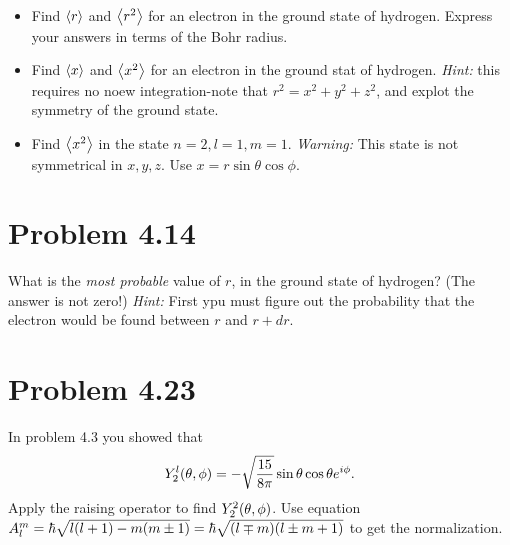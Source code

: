 \documentclass[../main.tex]{subfiles}
\begin{document}
\begin{itemize}
    \item Find $\expval{r}$ and $\expval{r^2}$ for an electron in the ground state of hydrogen.
        Express your answers in terms of the Bohr radius.
    \item Find $\expval{x}$ and $\expval{x^2}$ for an electron in the ground stat of hydrogen.
        \textit{Hint:} this requires no noew integration-note that $r^2=x^2+y^2+z^2$, and explot the symmetry of the ground state.
    \item Find $\expval{x^2}$ in the state $n=2,l=1,m=1$. \textit{Warning:} This state is not symmetrical in $x,y,z$.
        Use $x=r\sin\theta\cos\phi$.
\end{itemize}

\section{Problem 4.14}

What is the \textit{most probable} value of $r$, in the ground state of hydrogen?
(The answer is not zero!)
\textit{Hint:} First ypu must figure out the probability that the electron would be found between $r$ and $r+dr$.

\section{Problem 4.23}

In problem 4.3 you showed that 
\begin{gather*}
    Y^l_2\qty(\theta,\phi) = -\sqrt{\frac{15}{8\pi}}\sin\theta\cos\theta e^{i\phi}.
\end{gather*}
Apply the raising operator to find $Y^2_2\qty(\theta,\phi)$.
Use equation $ A^m_l =\hbar\sqrt{l\qty(l+1)-m\qty(m\pm1)}=\hbar\sqrt{\qty(l\mp m)\qty(l\pm m+1)} $ to get the normalization.
\end{document}
